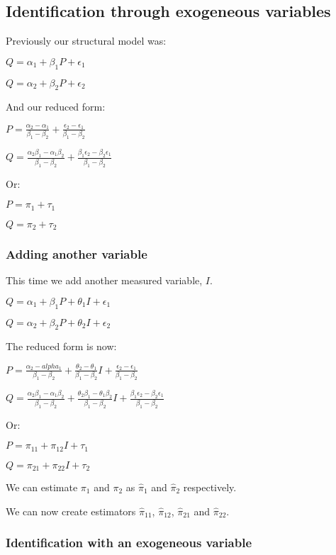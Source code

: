 
\subsection{Identification through exogeneous variables}

Previously our structural model was:

\(Q=\alpha_1 + \beta_1 P + \epsilon_1 \)

\(Q=\alpha_2 + \beta_2 P + \epsilon_2 \)

And our reduced form:

\(P =\frac{\alpha_2-\alpha_1 }{\beta_1-\beta_2}+\frac{\epsilon_2-\epsilon_1 }{\beta_1-\beta_2}\)

\(Q =\frac{\alpha_2\beta_1-\alpha_1\beta_2 }{\beta_1-\beta_2}+\frac{\beta_1\epsilon_2 -\beta_2\epsilon_1}{\beta_1-\beta_2}\)

Or:

\(P=\pi_1 + \tau_1 \)

\(Q= \pi_2 + \tau_2\)

\subsubsection{Adding another variable}

This time we add another measured variable, \(I\).

\(Q=\alpha_1 + \beta_1 P + \theta_1 I + \epsilon_1 \)

\(Q=\alpha_2 + \beta_2 P + \theta_2 I + \epsilon_2 \)

The reduced form is now:

\(P =\frac{\alpha_2 -alpha_1 }{\beta_1-\beta_2}+\frac{\theta_2-\theta_1 }{\beta_1-\beta_2}I+\frac{\epsilon_2-\epsilon_1}{\beta_1-\beta_2}\)

\(Q =\frac{\alpha_2\beta_1-\alpha_1\beta_2 }{\beta_1-\beta_2}+\frac{\theta_2\beta_1-\theta_1\beta_2}{\beta_1-\beta_2}I+\frac{\beta_1\epsilon_2 -\beta_2\epsilon_1}{\beta_1-\beta_2}\)

Or:

\(P =\pi_{11} +\pi_{12}I + \tau_1 \)

\(Q= \pi_{21} +\pi_{22}I + \tau_2 \)

We can estimate \(\pi_1 \) and \(\pi_2 \) as \(\hat \pi_1\) and \(\hat \pi_2\) respectively.

We can now create estimators \(\hat \pi_{11}\), \(\hat \pi_{12}\), \(\hat \pi_{21}\) and \(\hat \pi_{22}\).

\subsubsection{Identification with an exogeneous variable}

